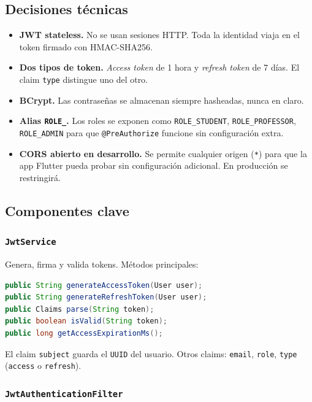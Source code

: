 \subsection{Decisiones técnicas}

\begin{itemize}[leftmargin=*]
  \item \textbf{JWT stateless.} No se usan sesiones HTTP. Toda la identidad viaja en el token firmado con HMAC-SHA256.
  \item \textbf{Dos tipos de token.} \textit{Access token} de 1 hora y \textit{refresh token} de 7 días. El claim \texttt{type} distingue uno del otro.
  \item \textbf{BCrypt.} Las contraseñas se almacenan siempre hasheadas, nunca en claro.
  \item \textbf{Alias \texttt{ROLE\_}.} Los roles se exponen como \texttt{ROLE\_STUDENT}, \texttt{ROLE\_PROFESSOR}, \texttt{ROLE\_ADMIN} para que \texttt{@PreAuthorize} funcione sin configuración extra.
  \item \textbf{CORS abierto en desarrollo.} Se permite cualquier origen (\texttt{*}) para que la app Flutter pueda probar sin configuración adicional. En producción se restringirá.
\end{itemize}

\subsection{Componentes clave}

\subsubsection{\texttt{JwtService}}

Genera, firma y valida tokens. Métodos principales:

\begin{lstlisting}[language=java]
public String generateAccessToken(User user);
public String generateRefreshToken(User user);
public Claims parse(String token);
public boolean isValid(String token);
public long getAccessExpirationMs();
\end{lstlisting}

El claim \texttt{subject} guarda el \texttt{UUID} del usuario. Otros claims: \texttt{email}, \texttt{role}, \texttt{type} (\texttt{access} o \texttt{refresh}).

\subsubsection{\texttt{JwtAuthenticationFilter}}

